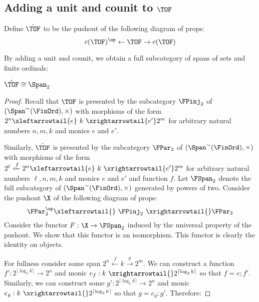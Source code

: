 \subsection{Adding a unit and counit to  \texorpdfstring{$\TOF$}{TOF}}
\begin{definition}
Define $\hat\TOF$ to be the pushout of the following diagram of props:
$$c(\TOF)^\op \leftarrow \TOF \rightarrow c(\TOF)$$
\end{definition}
By adding a unit and counit, we obtain a full subcategory of spans of sets and finite ordinals:
\begin{lemma}
\label{lemma:unitcounit}
$\hat \TOF \cong \Span_2$
\end{lemma}
\begin{proof}
Recall that $\TOF$ is presented by the subcategory $\FPinj_2$ of $(\Span^\sim (\FinOrd),\times)$ with morphisms of the form $ 2^n \xleftarrowtail{e}\ k\ \xrightarrowtail{e'} 2^m$ for arbitrary natural numbers $n,m,k$ and monics $e$ and $e'$.



Similarly, $\tilde \TOF$ is presented by the subcategory $\FPar_2$ of  $(\Span^\sim (\FinOrd),\times)$ with morphisms of the form $2^\ell \xleftarrow{f}  2^n  \xleftarrowtail{e}\ k \ \xrightarrowtail{e'}  2^m$ for arbitrary natural numbers $\ell, n,m,k$ and monics $e$ and $e'$ and function $f$.
Let $\FSpan_2$ denote the full subcategory of $(\Span^\sim(\FinOrd),\times)$ generated by powers of two.
Consider the pushout $\X$ of the following diagram of props:
$$\FPar_2^\op \xleftarrowtail{}  \ \FPinj_2 \ \xrightarrowtail{} \FPar_2$$ 
Consider the functor $F:\X\to\FSpan_2$ induced by the universal property of the pushout.  We show that this functor is an isomorphism.
This functor is clearly the identity on objects.

For fullness consider some span $2^n \xleftarrow{f} k \xrightarrow{g} 2^m$. We can construct a function $f':2^{\lceil \log_2 k \rceil} \rightarrow 2^n$ and monic $e_f: k \ \xrightarrowtail{} 2^{\lceil \log_2 k \rceil}$ so that $f=e;f'$.  Similarly, we can construct some  $g':2^{\lceil \log_2 k \rceil} \rightarrow 2^n$ and monic $e_g: k\ \xrightarrowtail{} 2^{\lceil \log_2 k \rceil}$ so that $g=e_g;g'$.  Therefore:



\end{proof}
